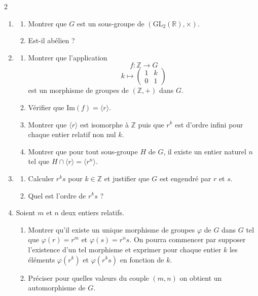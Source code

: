 \documentclass{article}
\begin{document}
\begin{paracol}{2}
{\begin{enumerate}
    \item 
    \begin{enumerate}
        \item Montrer que $G$ est un sous-groupe de $(\mathrm{GL}_2(\mathbb{R}), \times)$.
        \item Est-il abélien ?
    \end{enumerate}
    \item 
    \begin{enumerate}
        \item Montrer que l'application
        \[
        f : \mathbb{Z} \to G
        \]
        \[
        k \mapsto \begin{pmatrix} 1 & k \\ 0 & 1 \end{pmatrix}
        \]
        est un morphisme de groupes de $(\mathbb{Z}, +)$ dans $G$.
        \item Vérifier que $\mathrm{Im}(f) = \langle r \rangle$.
        \item Montrer que $\langle r \rangle$ est isomorphe à $\mathbb{Z}$ puis que $r^k$ est d'ordre infini pour chaque entier relatif non nul $k$.
        \item Montrer que pour tout sous-groupe $H$ de $G$, il existe un entier naturel $n$ tel que $H \cap \langle r \rangle = \langle r^n \rangle$.
    \end{enumerate}
    \item
    \begin{enumerate}
        \item Calculer $r^k s$ pour $k \in \mathbb{Z}$ et justifier que $G$ est engendré par $r$ et $s$.
    \switchcolumn
        \item[(b)] Quel est l'ordre de $r^k s$ ?
    \end{enumerate}

    \setcounter{enumi}{3}
    \item Soient $m$ et $n$ deux entiers relatifs.
    \begin{enumerate}
        \item Montrer qu'il existe un unique morphisme de groupes $\varphi$ de $G$ dans $G$ tel que $\varphi(r) = r^m$ et $\varphi(s) = r^n s$. On pourra commencer par supposer l'existence d'un tel morphisme et exprimer pour chaque entier $k$ les éléments $\varphi(r^k)$ et $\varphi(r^k s)$ en fonction de $k$.
        \item Préciser pour quelles valeurs du couple $(m, n)$ on obtient un automorphisme de $G$.
    \end{enumerate}
\end{enumerate}
}


\end{paracol}
\end{document}

